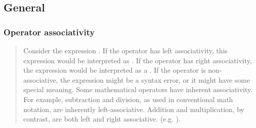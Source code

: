 \subsection{General}

\subsubsection{Operator associativity}

\begin{quote}
Consider the expression . If the operator \code{~} has left associativity, this expression would be interpreted as . If the operator has right associativity, the expression would be interpreted as a . If the operator is non-associative, the expression might be a syntax error, or it might have some special meaning. Some mathematical operators have inherent associativity. For example, subtraction and division, as used in conventional math notation, are inherently left-associative. Addition and multiplication, by contrast, are both left and right associative. (e.g. ). \cite{wikipedia_operator_associativity}
\end{quote}